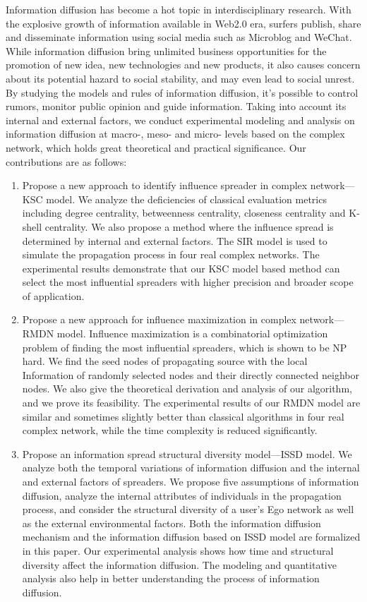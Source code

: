 
\begin{eabstract} 
   Information diffusion has become a hot topic in interdisciplinary research. With the explosive growth of information available in Web2.0 era, surfers publish, share and disseminate information using social media such as Microblog and WeChat. While information diffusion bring unlimited business opportunities for the promotion of new idea, new technologies and new products, it also causes concern about its potential hazard to social stability, and may even lead to social unrest. By studying the models and rules of information diffusion, it's possible to control rumors, monitor public opinion and guide information. Taking into account its internal and external factors, we conduct experimental modeling and analysis on information diffusion at macro-, meso- and micro- levels based on the complex network, which holds great theoretical and practical significance. Our contributions are as follows:
   \begin{enumerate}
   	\item Propose a new approach to identify influence spreader in complex network---KSC model. We analyze the deficiencies of classical evaluation metrics including degree centrality, betweenness centrality, closeness centrality and K-shell centrality. We also propose a method where the influence spread is determined by internal and external factors. The SIR model is used to simulate the propagation process in four real complex networks. The experimental results demonstrate that our KSC model based method can select the most influential spreaders with higher precision and broader scope of application.
   	\item Propose a new approach for influence maximization in complex network---RMDN model. Influence maximization is a combinatorial optimization problem of finding the most influential spreaders, which is shown to be NP hard. We find the seed nodes of propagating source with the local Information of randomly selected nodes and their directly connected neighbor nodes. We also give the theoretical derivation and analysis of our algorithm, and we prove its feasibility. The experimental results of our RMDN model are similar and sometimes slightly better than classical algorithms in four real complex network, while the time complexity is reduced significantly.
   	\item Propose an information spread structural diversity model---ISSD model. We analyze both the temporal variations of information diffusion and the internal and external factors of spreaders. We propose five assumptions of information diffusion, analyze the internal attributes of individuals in the propagation process, and consider the structural diversity of a user's Ego network as well as the external environmental factors. Both the information diffusion mechanism and the information diffusion based on ISSD model are formalized in this paper. Our experimental analysis shows how time and structural diversity affect the information diffusion. The modeling and quantitative analysis also help in better understanding the process of information diffusion.

\end{enumerate}
\end{eabstract}
